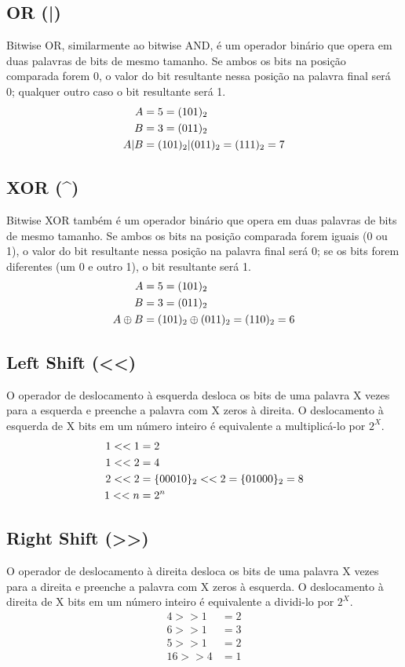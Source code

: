 \documentclass{article}
\begin{document}
\subsection{OR (|)}
Bitwise OR, similarmente ao bitwise AND, é um operador binário que opera em duas palavras de bits de mesmo tamanho. Se ambos os bits na posição comparada forem 0, o valor do bit resultante nessa posição na palavra final será 0; qualquer outro caso o bit resultante será 1.
\begin{align*}
A &= 5 = (101)\textsubscript{2} \\
B &= 3 = (011)\textsubscript{2} \\
A | B &= (101)\textsubscript{2} | (011)\textsubscript{2} = (111)\textsubscript{2} = 7
\end{align*}

\subsection{XOR (^)}

Bitwise XOR também é um operador binário que opera em duas palavras de bits de mesmo tamanho. Se ambos os bits na posição comparada forem iguais (0 ou 1), o valor do bit resultante nessa posição na palavra final será 0; se os bits forem diferentes (um 0 e outro 1), o bit resultante será 1.
\begin{align*}
A &= 5 = (101)\textsubscript{2} \\
B &= 3 = (011)\textsubscript{2} \\
A \oplus B &= (101)\textsubscript{2} \oplus (011)\textsubscript{2} = (110)\textsubscript{2} = 6
\end{align*}

\subsection{Left Shift (<<)}
O operador de deslocamento à esquerda desloca os bits de uma palavra X vezes para a esquerda e preenche a palavra com X zeros à direita. O deslocamento à esquerda de X bits em um número inteiro é equivalente a multiplicá-lo por \(2^X\).
\begin{align*}
1 << 1 &= 2 \\
1 << 2 &= 4 \\
2 << 2 &= \{00010\}\textsubscript{2} << 2 = \{01000\}\textsubscript{2} = 8 \\
1 << n &= 2^n
\end{align*}

\subsection{Right Shift (>>)}
O operador de deslocamento à direita desloca os bits de uma palavra X vezes para a direita e preenche a palavra com X zeros à esquerda. O deslocamento à direita de X bits em um número inteiro é equivalente a dividi-lo por \(2^X\).
\begin{align*}
4 >> 1 &= 2 \\
6 >> 1 &= 3 \\
5 >> 1 &= 2 \\
16 >> 4 &= 1
\end{align*}
\end{document}
